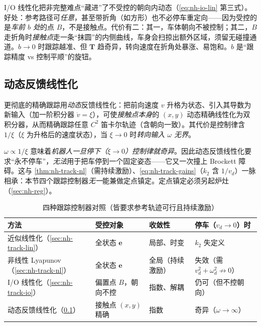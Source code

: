 \begin{insight}\label{ins:nh-io-tradeoff}
I/O 线性化把非完整难点“藏进”了不受控的朝向内动态（\cref{eq:nh-io-lin} 第三式）。好处：参考路径可\emph{任意}，甚至带折角（如方形）也不必停车重定向——因为受控的是\emph{车前 $b$ 处}的点 $B$，不是接触点。代价有二：其一，车体朝向不被控制；其二，$B$ 走折角时\emph{接触点}走一条“抹圆”的内侧曲线，车身会扫掠出额外区域，须留无碰撞通道。$b\to0$ 时跟踪越准、但 $\mathbf{T}$ 趋奇异，转向速度在折角处暴涨、易饱和。$b$ 是“跟踪精度 vs 控制平顺”的旋钮。
\end{insight}

\subsection{动态反馈线性化}
\label{sec:nh-track-dfl}

更彻底的精确跟踪用\emph{动态}反馈线性化：把前向速度 $v$ 升格为状态、引入其导数为新输入（加一阶积分器 $\dot v=\xi$），可使\emph{接触点本身}的 $(x,y)$ 动态精确线性化为双积分器，从而精确跟踪任意 $C^2$ 笛卡尔轨迹（含朝向一致）。其代价是控制律含 $1/\xi$（$\xi$ 为升格后的速度状态），当 $\xi\to0$ 时\emph{转向输入 $\omega$ 无界}。

\begin{pitfall}[动态反馈线性化不能用于定点镇定]
$\omega\propto1/\xi$ 意味着\emph{机器人一旦停下（$\xi\to0$）控制律就奇异}。因此动态反馈线性化要求“永不停车”，\emph{无法}用于把车停到一个固定姿态——它又一次撞上 Brockett 障碍。这与 \cref{thm:nh-track-nl}（需持续激励）、\cref{eq:nh-track-gains}（$k_2$ 含 $1/v_d$）一脉相承：本节四个跟踪控制器\emph{无一}能兼做定点镇定。定点镇定必须另起炉灶（\cref{sec:nh-reg}）。
\end{pitfall}

\begin{table}[H]\centering\small
\caption{四种跟踪控制器对照（皆要求参考轨迹可行且持续激励）}
\label{tab:nh-track}
\begin{tabular}{llll}
\toprule
方法 & 受控对象 & 收敛性 & 停车（$v_d\to0$）时 \\
\midrule
近似线性化（\cref{sec:nh-track-lin}） & 全状态 $\mathbf{e}$ & 局部、时变 & $k_2$ 失定义 \\
非线性 Lyapunov（\cref{sec:nh-track-nl}） & 全状态 $\mathbf{e}$ & 全局（持续激励） & 失效（需 $v_d^2{+}\omega_d^2\not\to0$） \\
I/O 线性化（\cref{sec:nh-track-io}） & 偏置点 $B$，朝向不控 & 指数、解耦 & 仍可（但不控朝向） \\
动态反馈线性化（\cref{sec:nh-track-dfl}） & 接触点 $(x,y)$ 精确 & 指数 & 奇异（$\omega\to\infty$） \\
\bottomrule
\end{tabular}
\end{table}

